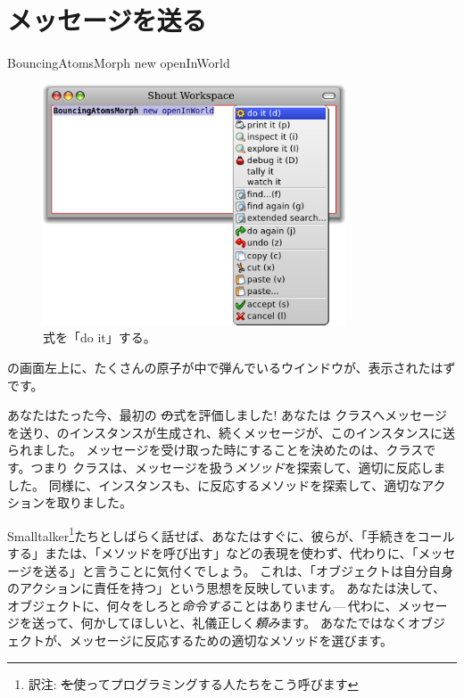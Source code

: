 \documentclass[a4paper,10pt,twoside]{book}
\begin{document}
\section{メッセージを送る}


\begin{code}{}
BouncingAtomsMorph new openInWorld
\end{code}


\begin{figure}[htb]
\centerline {\includegraphics[width=0.8\textwidth]{Doit}}
\caption{式を「do it」する。}
\end{figure}

\pharo の画面左上に、たくさんの原子が中で弾んでいるウインドウが、表示されたはずです。

あなたはたった今、最初の \st の式を評価しました!
あなたは \bam クラスへメッセージを送り、\bam のインスタンスが生成され、続くメッセージが、このインスタンスに送られました。
メッセージを受け取った時にすることを決めたのは、\bam クラスです。つまり \bam クラスは、メッセージを扱う\emph{メソッド}を探索して、適切に反応しました。
同様に、\bam インスタンスも、に反応するメソッドを探索して、適切なアクションを取りました。

Smalltalker\footnote{訳注: \st を使ってプログラミングする人たちをこう呼びます}たちとしばらく話せば、あなたはすぐに、彼らが、「手続きをコールする」または、「メソッドを呼び出す」などの表現を使わず、代わりに、「メッセージを送る」と言うことに気付くでしょう。
これは、「オブジェクトは自分自身のアクションに責任を持つ」という思想を反映しています。
あなたは決して、オブジェクトに、何々をしろと\emph{命令する}ことはありません\,---\,代わに、メッセージを送って、何かしてほしいと、礼儀正しく\emph{頼み}ます。
あなたではなくオブジェクトが、メッセージに反応するための適切なメソッドを選びます。
\end{document}

